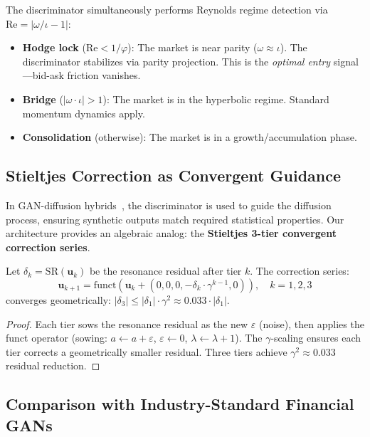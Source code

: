 The discriminator simultaneously performs Reynolds regime detection via $\mathrm{Re} = |\omega/\iota - 1|$:
\begin{itemize}[noitemsep]
  \item \textbf{Hodge lock} ($\mathrm{Re} < 1/\varphi$): The market is near parity ($\omega \approx \iota$). The discriminator stabilizes via parity projection. This is the \emph{optimal entry} signal---bid-ask friction vanishes.
  \item \textbf{Bridge} ($|\omega \cdot \iota| > 1$): The market is in the hyperbolic regime. Standard momentum dynamics apply.
  \item \textbf{Consolidation} (otherwise): The market is in a growth/accumulation phase.
\end{itemize}

\subsection{Stieltjes Correction as Convergent Guidance}

In GAN-diffusion hybrids~\cite{gans_diffusion2024}, the discriminator is used to guide the diffusion process, ensuring synthetic outputs match required statistical properties. Our architecture provides an algebraic analog: the \textbf{Stieltjes 3-tier convergent correction series}.

\begin{theorem}
Let $\delta_k = \mathrm{SR}(\mathbf{u}_k)$ be the resonance residual after tier $k$. The correction series:
\begin{equation}
    \mathbf{u}_{k+1} = \mathrm{funct}\!\left(\mathbf{u}_k + (0, 0, 0, -\delta_k \cdot \gamma^{k-1}, 0)\right), \quad k = 1, 2, 3
\end{equation}
converges geometrically: $|\delta_3| \leq |\delta_1| \cdot \gamma^2 \approx 0.033 \cdot |\delta_1|$.
\begin{proof}
Each tier sows the resonance residual as the new $\varepsilon$ (noise), then applies the funct operator (sowing: $a \leftarrow a + \varepsilon$, $\varepsilon \leftarrow 0$, $\lambda \leftarrow \lambda + 1$). The $\gamma$-scaling ensures each tier corrects a geometrically smaller residual. Three tiers achieve $\gamma^2 \approx 0.033$ residual reduction. \qedhere
\end{proof}
\end{theorem}

\subsection{Comparison with Industry-Standard Financial GANs}


